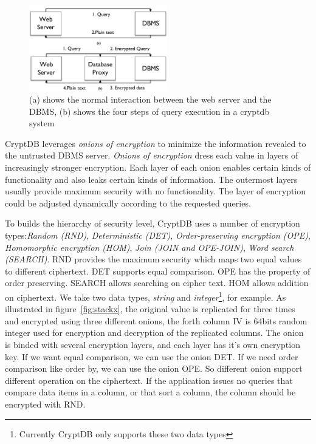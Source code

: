 \begin{figure}[tb]
\centering
\includegraphics[width=6cm]{images/Cryptdb-structure2.pdf}
\caption{(a) shows the normal interaction between the web server and the DBMS, (b) shows the four steps of query execution in a cryptdb system}
\label{fig:stack1}
\end{figure}



CryptDB leverages \emph{onions of encryption} to minimize the information revealed to the untrusted DBMS server. 
\emph{Onions of encryption} dress each value in layers of increasingly stronger encryption. 
Each layer of each onion enables certain kinds of functionality and also leaks certain kinds of information.
The outermost layers usually provide maximum security with no functionality.
The layer of encryption could be adjusted dynamically according to the requested queries. 

To builds the hierarchy of security level, CryptDB uses a number of encryption types:\textit{Random (RND)}, \textit{Deterministic (DET)}, \textit{Order-preserving encryption (OPE)}, \textit{Homomorphic encryption (HOM)}, \textit{Join (JOIN and OPE-JOIN)}, \textit{Word search (SEARCH)}.
RND provides the maximum security which maps two equal values to different ciphertext. DET supports equal comparison. OPE has the property of order preserving. SEARCH allows searching on cipher text. HOM allows addition on ciphertext. We take two data types, \emph{string} and \emph{integer}\footnote{Currently CryptDB only supports these two data types}, for example. As illustrated in figure~\ref{fig:stackx}, the original value is replicated for three times and encrypted using three different onions, the forth column IV is 64bits random integer used for encryption and decryption of the replicated columns. The onion is binded with several encryption layers, and each layer has it's own encryption key. If we want equal comparison, we can use the onion DET. If we need order comparison like order by, we can use the onion OPE. So different onion support different operation on the ciphertext. If the application issues no queries that compare data items in a column, or that sort a column, the column should be encrypted with RND.


